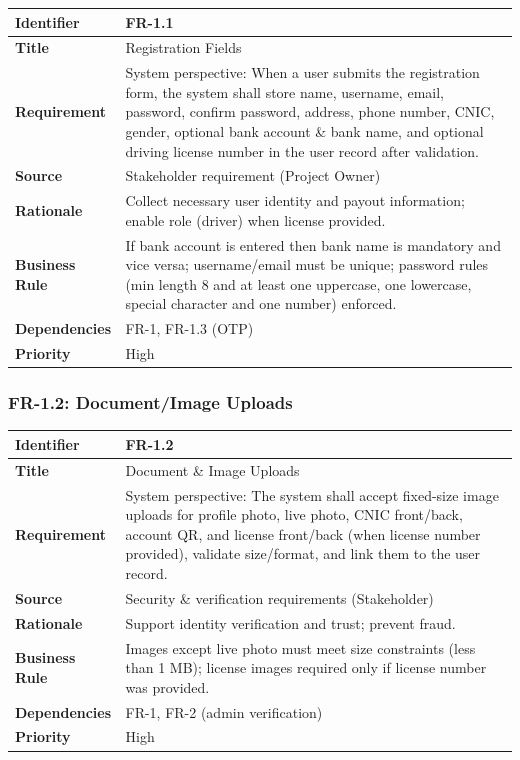 \begin{longtable}{|p{3cm}|p{12cm}|}
\hline
\rowcolor{lightgray!30}
\textbf{Identifier} & FR-1.1 \\
\hline
\textbf{Title} & Registration Fields \\
\hline
\textbf{Requirement} & System perspective: When a user submits the registration form, the system shall store name, username, email, password, confirm password, address, phone number, CNIC, gender, optional bank account \& bank name, and optional driving license number in the user record after validation. \\
\hline
\textbf{Source} & Stakeholder requirement (Project Owner) \\
\hline
\textbf{Rationale} & Collect necessary user identity and payout information; enable role (driver) when license provided. \\
\hline
\textbf{Business Rule} & If bank account is entered then bank name is mandatory and vice versa; username/email must be unique; password rules (min length 8 and at least one uppercase, one lowercase, special character and one number) enforced. \\
\hline
\textbf{Dependencies} & FR-1, FR-1.3 (OTP) \\
\hline
\textbf{Priority} & High \\
\hline
\end{longtable}

\subsubsection{FR-1.2: Document/Image Uploads}

\begin{longtable}{|p{3cm}|p{12cm}|}
\hline
\rowcolor{lightgray!30}
\textbf{Identifier} & FR-1.2 \\
\hline
\textbf{Title} & Document \& Image Uploads \\
\hline
\textbf{Requirement} & System perspective: The system shall accept fixed-size image uploads for profile photo, live photo, CNIC front/back, account QR, and license front/back (when license number provided), validate size/format, and link them to the user record. \\
\hline
\textbf{Source} & Security \& verification requirements (Stakeholder) \\
\hline
\textbf{Rationale} & Support identity verification and trust; prevent fraud. \\
\hline
\textbf{Business Rule} & Images except live photo must meet size constraints (less than 1 MB); license images required only if license number was provided. \\
\hline
\textbf{Dependencies} & FR-1, FR-2 (admin verification) \\
\hline
\textbf{Priority} & High \\
\hline
\end{longtable}

